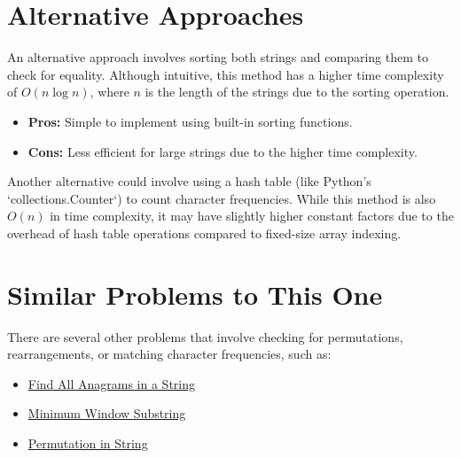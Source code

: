 \section*{Alternative Approaches}
An alternative approach involves sorting both strings and comparing them to check for equality. Although intuitive, this method has a higher time complexity of \(O(n \log n)\), where \(n\) is the length of the strings due to the sorting operation.

\begin{itemize}
    \item \textbf{Pros:} Simple to implement using built-in sorting functions.
    \item \textbf{Cons:} Less efficient for large strings due to the higher time complexity.
\end{itemize}

Another alternative could involve using a hash table (like Python's `collections.Counter`) to count character frequencies. While this method is also \(O(n)\) in time complexity, it may have slightly higher constant factors due to the overhead of hash table operations compared to fixed-size array indexing.


\section*{Similar Problems to This One}
There are several other problems that involve checking for permutations, rearrangements, or matching character frequencies, such as:
\begin{itemize}
    \item \hyperref[problem:find_permutation]{Find All Anagrams in a String}
    \item \hyperref[problem:minimum_window_substring]{Minimum Window Substring}
    \item \hyperref[problem:permutation_in_string]{Permutation in String}
\end{itemize}

